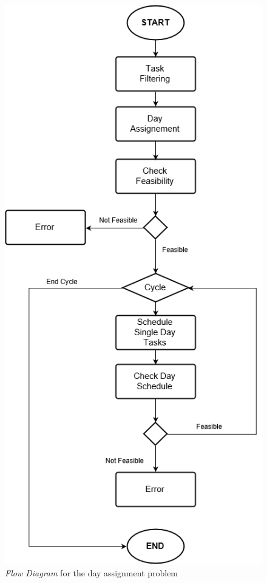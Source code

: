 \begin{figure}[H]
    \centering
    \includegraphics[scale=0.6]{Pictures/FlowDiagram/Algorithm2.png}
    \caption{\emph{Flow Diagram} for the day assignment problem}
    \label{fig:scheduleAlg}
\end{figure}

